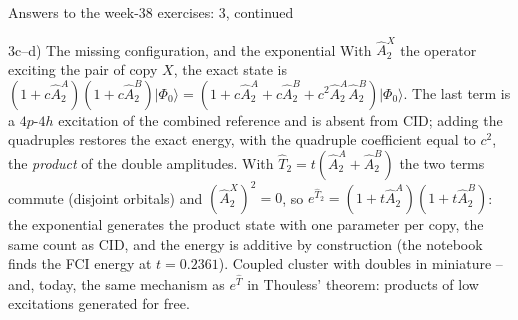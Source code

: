 \documentclass[aspectratio=169,10pt]{beamer}
\newcommand{\ket}[1]{\vert #1\rangle}
\begin{document}
\begin{frame}{Answers to the week-38 exercises: 3, continued}
  \footnotesize
  \begin{block}{3c--d) The missing configuration, and the exponential}
    With $\hat{A}_2^X$ the operator exciting the pair of copy $X$, the exact state is $(1+c\hat{A}_2^A)(1+c\hat{A}_2^B)\ket{\Phi_0}=(1+c\hat{A}_2^A+c\hat{A}_2^B+c^2\hat{A}_2^A\hat{A}_2^B)\ket{\Phi_0}$. The last term is a $4p$-$4h$ excitation of the combined reference and is absent from CID; adding the quadruples restores the exact energy, with the quadruple coefficient equal to $c^2$, the \emph{product} of the double amplitudes. With $\hat{T}_2=t(\hat{A}_2^A+\hat{A}_2^B)$ the two terms commute (disjoint orbitals) and $(\hat{A}_2^X)^2=0$, so $e^{\hat{T}_2}=(1+t\hat{A}_2^A)(1+t\hat{A}_2^B)$: the exponential generates the product state with one parameter per copy, the same count as CID, and the energy is additive by construction (the notebook finds the FCI energy at $t=0.2361$). Coupled cluster with doubles in miniature -- and, today, the same mechanism as $e^{\hat{T}}$ in Thouless' theorem: products of low excitations generated for free.
  \end{block}
\end{frame}
\end{document}
